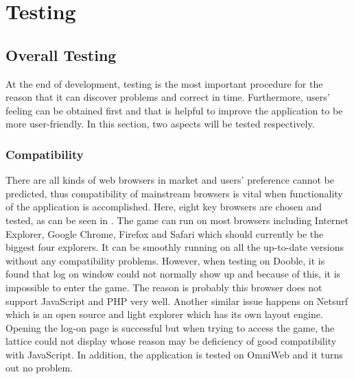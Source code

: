 \chapter{Testing}
\section{Overall Testing}
At the end of development, testing is the most important procedure for the reason that it can discover problems and correct in time. Furthermore, users' feeling can be obtained first and that is helpful to improve the application to be more user-friendly. In this section, two aspects will be tested respectively.
\subsection{Compatibility}
There are all kinds of web browsers in market and users' preference cannot be predicted, thus compatibility of mainstream browsers is vital when functionality of the application is accomplished. Here, eight key browsers are chosen and tested, as can be seen in . The game can run on most browsers including Internet Explorer, Google Chrome, Firefox and Safari which should currently be the biggest four explorers. It can be smoothly running on all the up-to-date versions without any compatibility problems. However, when testing on Dooble, it is found that log on window could not normally show up and because of this, it is impossible to enter the game. The reason is probably this browser does not support JavaScript and PHP very well. Another similar issue happens on Netsurf which is an open source and light explorer which has its own layout engine. Opening the log-on page is successful but when trying to access the game, the lattice could not display whose reason may be deficiency of good compatibility with JavaScript. In addition, the application is tested on OmniWeb and it turns out no problem.


